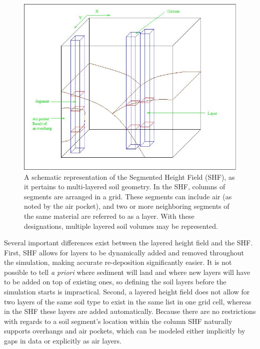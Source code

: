 \begin{figure}[t]
\begin{minipage}[b]{0.9\linewidth}
\begin{center}
\includegraphics[width=\textwidth]{images/SegmentedHeightField_Schematic.jpg}
\end{center}
\end{minipage}
\caption[Abstract schematic of the Segmented Height Field (SHF)]
{\label{figure:SHFAbstract} A schematic representation of the Segmented Height Field (SHF), as it pertains to multi-layered soil geometry. In the SHF, columns of segments are arranged in a grid. These segments can include air (as noted by the air pocket), and two or more neighboring segments of the same material are referred to as a layer. With these designations, multiple layered soil volumes may be represented. }
\end{figure}

Several important differences exist between the layered height field and the SHF.  First, SHF allows for layers to be dynamically added and removed throughout the simulation, making accurate re-deposition significantly easier. It is not possible to tell \textit{a priori} where sediment will land and where new layers will have to be added on top of existing ones, so defining the soil layers before the simulation starts is impractical. Second, a layered height field does not allow for two layers of the same soil type to exist in the same list in one grid cell, whereas in the SHF these layers are added automatically. Because there are no restrictions with regards to a soil segment's location within the column SHF naturally supports overhangs and air pockets, which can be modeled either implicitly by gaps in data or explicitly as air layers.

